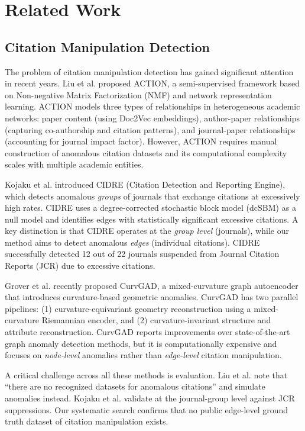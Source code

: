 \documentclass[11pt,letterpaper]{article}
\begin{document}
\section{Related Work}

\subsection{Citation Manipulation Detection}

The problem of citation manipulation detection has gained significant attention in recent years. Liu et al. \cite{Liu2024} proposed ACTION, a semi-supervised framework based on Non-negative Matrix Factorization (NMF) and network representation learning. ACTION models three types of relationships in heterogeneous academic networks: paper content (using Doc2Vec embeddings), author-paper relationships (capturing co-authorship and citation patterns), and journal-paper relationships (accounting for journal impact factor). However, ACTION requires manual construction of anomalous citation datasets and its computational complexity scales with multiple academic entities.

Kojaku et al. \cite{Kojaku2021} introduced CIDRE (Citation Detection and Reporting Engine), which detects anomalous \textit{groups} of journals that exchange citations at excessively high rates. CIDRE uses a degree-corrected stochastic block model (dcSBM) as a null model and identifies edges with statistically significant excessive citations. A key distinction is that CIDRE operates at the \textit{group level} (journals), while our method aims to detect anomalous \textit{edges} (individual citations). CIDRE successfully detected 12 out of 22 journals suspended from Journal Citation Reports (JCR) due to excessive citations.

Grover et al. \cite{Grover2025} recently proposed CurvGAD, a mixed-curvature graph autoencoder that introduces curvature-based geometric anomalies. CurvGAD has two parallel pipelines: (1) curvature-equivariant geometry reconstruction using a mixed-curvature Riemannian encoder, and (2) curvature-invariant structure and attribute reconstruction. CurvGAD reports improvements over state-of-the-art graph anomaly detection methods, but it is computationally expensive and focuses on \textit{node-level} anomalies rather than \textit{edge-level} citation manipulation.

A critical challenge across all these methods is evaluation. Liu et al. \cite{Liu2024} note that ``there are no recognized datasets for anomalous citations'' and simulate anomalies instead. Kojaku et al. \cite{Kojaku2021} validate at the journal-group level against JCR suppressions. Our systematic search confirms that no public edge-level ground truth dataset of citation manipulation exists.
\end{document}

